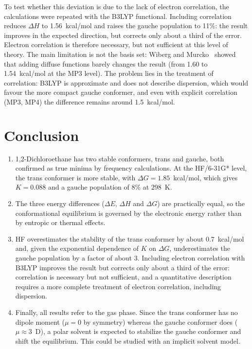 \documentclass[10pt,a4paper]{article}
\begin{document}
To test whether this deviation is due to the lack of electron correlation, the
calculations were repeated with the B3LYP functional. Including correlation reduces
$\Delta H$ to 1.56~kcal/mol and raises the gauche population to 11\%: the result
improves in the expected direction, but corrects only about a third of the error.
Electron correlation is therefore necessary, but not sufficient at this level of
theory. The main limitation is not the basis set: Wiberg and Murcko~\cite{wiberg1987}
showed that adding diffuse functions barely changes the result (from 1.60 to
1.54~kcal/mol at the MP3 level). The problem lies in the treatment of correlation:
B3LYP is approximate and does not describe dispersion, which would favour the more
compact gauche conformer, and even with explicit correlation (MP3, MP4) the difference
remains around 1.5~kcal/mol.

\section{Conclusion} %

\begin{enumerate}
  \item 1,2-Dichloroethane has two stable conformers, trans and gauche, both confirmed
    as true minima by frequency calculations. At the HF/6-31G* level, the trans conformer
    is more stable, with $\Delta G = 1.85$~kcal/mol, which gives $K = 0.088$ and a gauche
    population of 8\% at \SI{298}{\kelvin}.
  \item The three energy differences ($\Delta E$, $\Delta H$ and $\Delta G$) are
    practically equal, so the conformational equilibrium is governed by the electronic
    energy rather than by entropic or thermal effects.
  \item HF overestimates the stability of the trans conformer by about 0.7~kcal/mol and,
    given the exponential dependence of $K$ on $\Delta G$, underestimates the gauche
    population by a factor of about 3. Including electron correlation with B3LYP improves
    the result but corrects only about a third of the error: correlation is necessary but
    not sufficient, and a quantitative description requires a more complete treatment of
    electron correlation, including dispersion.
  \item Finally, all results refer to the gas phase. Since the trans conformer has no
    dipole moment ($\mu = 0$ by symmetry) whereas the gauche conformer does
    ($\mu \approx 3$~D), a polar solvent is expected to stabilize the gauche conformer
    and shift the equilibrium. This could be studied with an implicit solvent model.
\end{enumerate}


\end{document}
